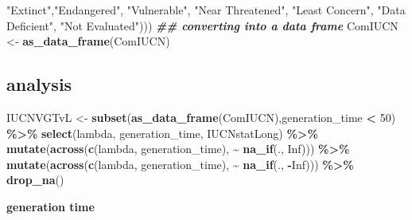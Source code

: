 \documentclass[
]{article}
\newenvironment{Shaded}{\begin{snugshade}}{\end{snugshade}}
\newcommand{\ConstantTok}[1]{\textcolor[rgb]{0.56,0.35,0.01}{#1}}
\newcommand{\DecValTok}[1]{\textcolor[rgb]{0.00,0.00,0.81}{#1}}
\newcommand{\DocumentationTok}[1]{\textcolor[rgb]{0.56,0.35,0.01}{\textbf{\textit{#1}}}}
\newcommand{\FunctionTok}[1]{\textcolor[rgb]{0.13,0.29,0.53}{\textbf{#1}}}
\newcommand{\NormalTok}[1]{#1}
\newcommand{\OtherTok}[1]{\textcolor[rgb]{0.56,0.35,0.01}{#1}}
\newcommand{\SpecialCharTok}[1]{\textcolor[rgb]{0.81,0.36,0.00}{\textbf{#1}}}
\newcommand{\StringTok}[1]{\textcolor[rgb]{0.31,0.60,0.02}{#1}}
\begin{document}
\begin{Shaded}
\begin{Highlighting}[]
                                   \StringTok{"Extinct"}\NormalTok{,}\StringTok{"Endangered"}\NormalTok{,}
                                   \StringTok{"Vulnerable"}\NormalTok{,}
                                   \StringTok{"Near Threatened"}\NormalTok{,}
                                   \StringTok{"Least Concern"}\NormalTok{,}
                                   \StringTok{"Data Deficient"}\NormalTok{,}
                                   \StringTok{"Not Evaluated"}\NormalTok{)))}
\DocumentationTok{\#\# converting into a data frame}
\NormalTok{ComIUCN }\OtherTok{\textless{}{-}} \FunctionTok{as\_data\_frame}\NormalTok{(ComIUCN)}
\end{Highlighting}
\end{Shaded}

\subsection{analysis}\label{analysis}

\begin{Shaded}
\begin{Highlighting}[]
\NormalTok{IUCNVGTvL }\OtherTok{\textless{}{-}} \FunctionTok{subset}\NormalTok{(}\FunctionTok{as\_data\_frame}\NormalTok{(ComIUCN),generation\_time }\SpecialCharTok{\textless{}} \DecValTok{50}\NormalTok{) }\SpecialCharTok{\%\textgreater{}\%}
  \FunctionTok{select}\NormalTok{(lambda, generation\_time, IUCNstatLong) }\SpecialCharTok{\%\textgreater{}\%} 
  \FunctionTok{mutate}\NormalTok{(}\FunctionTok{across}\NormalTok{(}\FunctionTok{c}\NormalTok{(lambda, generation\_time), }
                \SpecialCharTok{\textasciitilde{}} \FunctionTok{na\_if}\NormalTok{(., }\ConstantTok{Inf}\NormalTok{))) }\SpecialCharTok{\%\textgreater{}\%} 
  \FunctionTok{mutate}\NormalTok{(}\FunctionTok{across}\NormalTok{(}\FunctionTok{c}\NormalTok{(lambda, generation\_time), }
                \SpecialCharTok{\textasciitilde{}} \FunctionTok{na\_if}\NormalTok{(., }\SpecialCharTok{{-}}\ConstantTok{Inf}\NormalTok{))) }\SpecialCharTok{\%\textgreater{}\%}
  \FunctionTok{drop\_na}\NormalTok{()}
\end{Highlighting}
\end{Shaded}

\textbf{generation time}

\begin{Shaded}
\end{Shaded}
\end{document}
